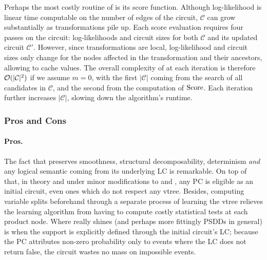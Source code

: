 Perhaps the most costly routine of  is its score function. Although
log-likelihood is linear time computable on the number of edges of the circuit, $\mathcal{C}$ can
grow substantially as transformations pile up. Each score evaluation requires four passes on the
circuit: log-likelihoods and circuit sizes for both $\mathcal{C}$ and its updated circuit
$\mathcal{C}'$. However, since transformations are local, log-likelihood and circuit sizes only
change for the nodes affected in the transformation and their ancestors, allowing
 to cache values. The overall complexity of  at each
iteration is therefore $\mathcal{O}(|\mathcal{C}|^2)$ if we assume $m=0$, with the first $|\mathcal{C}|$
coming from the search of all candidates in $\mathcal{C}$, and the second from the computation of
$\operatorname{\normalfont{Score}}$. Each iteration further increases $|\mathcal{C}|$, slowing down the algorithm's runtime.

\subsubsection{Pros and Cons}

\paragraph{Pros.} The fact that  preserves smoothness, structural
decomposability, determinism \emph{and} any logical semantic coming from its underlying LC is
remarkable. On top of that, in theory and under minor modifications to  and
, any PC is eligible as an initial circuit, even ones which do not respect any
vtree. Besides, computing variable splits beforehand through a separate process of learning the
vtree relieves the learning algorithm from having to compute costly statistical tests at each
product node. Where  really shines (and perhaps more fittingly PSDDs in
general) is when the support is explicitly defined through the initial circuit's LC; because the PC
attributes non-zero probability only to events where the LC does not return false, the circuit
wastes no mass on impossible events.

